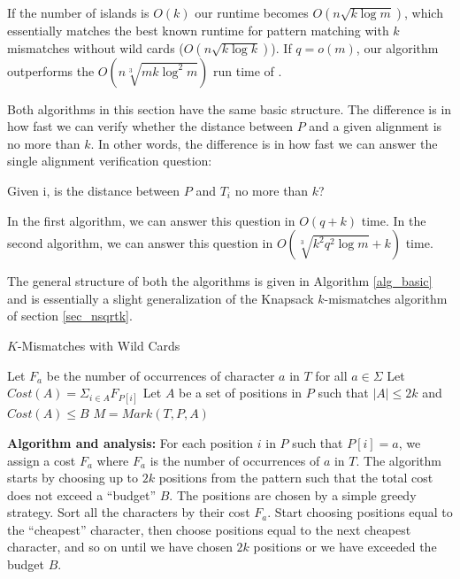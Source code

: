 If the number of islands is $O(k)$ our runtime becomes $O(n\sqrt{k \log m})$,
which essentially matches the best known runtime for pattern matching with $k$
mismatches without wild cards ($O(n\sqrt{k\log k})$).
 If $q=o(m)$, our algorithm outperforms the $O(n\sqrt[3]{mk\log^2m})$ run time
 of \cite{CP07}. 
 
Both algorithms in this section have the same basic structure. The
difference is in how fast we can verify whether the distance between $P$ and a given alignment
is no more than $k$. In other words, the difference is in how fast we can answer
the single alignment verification question:

\begin{question}
Given i, is the distance between $P$ and $T_i$ no more than $k$?
\end{question}

In the first algorithm, we can answer this question in $O(q+k)$ time. In the
second algorithm, we can answer this question in $O(\sqrt[3]{k^2q^2\log
m} + k)$ time.

The general structure of both the algorithms is given in Algorithm
\ref{alg_basic} and is essentially a slight generalization of the Knapsack
$k$-mismatches algorithm of section \ref{sec_nsqrtk}.


\begin{algorithm}
\caption{$K$-Mismatches with Wild Cards}\label{alg_basic}
Let $F_a$ be the number of occurrences of character $a$ in $T$ for all $a \in
\Sigma$\; 
Let $Cost(A)=\Sigma_{i \in A}F_{P[i]}$\;
Let $A$ be a set of positions in $P$ such that $|A|\leq 2k$
and $Cost(A) \leq B$\; 
$M=Mark(T, P, A)$\;
\;
\end{algorithm}

{\bf Algorithm and analysis:} 
For each position $i$ in $P$ such that $P[i]=a$, we assign a cost $F_a$ where
$F_a$ is the number of occurrences of $a$ in $T$. The algorithm starts by
choosing up to $2k$ positions from the pattern such that the total cost does not exceed a ``budget''
$B$. The positions are chosen by a simple greedy strategy. Sort all the
characters by their cost $F_a$. Start choosing positions equal to the ``cheapest''
character, then choose positions equal to the next cheapest character, and
so on until we have chosen $2k$ positions or we have exceeded the budget $B$.

